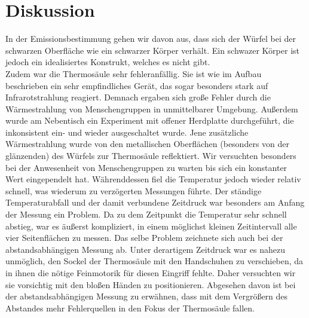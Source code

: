\section{Diskussion}
\label{sec:Diskussion}
In der Emissionsbestimmung gehen wir davon aus, dass sich der Würfel bei der schwarzen Oberfläche wie ein schwarzer Körper verhält.
Ein schwazer Körper ist jedoch ein idealisiertes Konstrukt, welches es nicht gibt.\\
Zudem war die Thermosäule sehr fehleranfällig.
Sie ist wie im Aufbau beschrieben ein sehr empfindliches Gerät, das sogar besonders stark auf Infrarotstrahlung reagiert.
Demnach ergaben sich große Fehler durch die Wärmestrahlung von Menschengruppen in unmittelbarer Umgebung.
Außerdem wurde am Nebentisch ein Experiment mit offener Herdplatte durchgeführt, die inkonsistent ein- und wieder ausgeschaltet wurde.
Jene zusätzliche Wärmestrahlung wurde von den metallischen Oberflächen (besonders von der glänzenden) des Würfels zur Thermosäule reflektiert.
Wir versuchten besonders bei der Anwesenheit von Menschengruppen zu warten bis sich ein konstanter Wert eingependelt hat.
Währenddessen fiel die Temperatur jedoch wieder relativ schnell, was wiederum zu verzögerten Messungen führte.
Der ständige Temperaturabfall und der damit verbundene Zeitdruck war besonders am Anfang der Messung ein Problem.
Da zu dem Zeitpunkt die Temperatur sehr schnell abstieg, war es äußerst kompliziert, in einem möglichst kleinen Zeitintervall alle vier Seitenflächen zu messen.
Das selbe Problem zeichnete sich auch bei der abstandsabhängigen Messung ab.
Unter derartigem Zeitdruck war es nahezu unmöglich, den Sockel der Thermosäule mit den Handschuhen zu verschieben, da in ihnen die nötige Feinmotorik für diesen Eingriff fehlte.
Daher versuchten wir sie vorsichtig mit den bloßen Händen zu positionieren.
Abgesehen davon ist bei der abstandsabhängigen Messung zu erwähnen, dass mit dem Vergrößern des Abstandes mehr Fehlerquellen in den Fokus der Thermosäule fallen.
